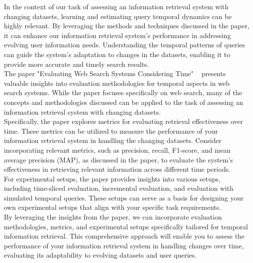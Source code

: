 In the context of our task of assessing an information retrieval system with changing datasets, learning and estimating
query temporal dynamics can be highly relevant.
By leveraging the methods and techniques discussed in the paper, it can enhance our information retrieval system's
performance in addressing evolving user information needs.
Understanding the temporal patterns of queries can guide the system's adaptation to changes in the datasets, enabling it
to provide more accurate and timely search results. \\

The paper "Evaluating Web Search Systems Considering Time" ~\cite{hofmann2014evaluating} presents valuable insights into
evaluation methodologies for temporal aspects in web search systems.
While the paper focuses specifically on web search, many of the concepts and methodologies discussed can be applied to
the task of assessing an information retrieval system with changing datasets. \\

Specifically, the paper explores metrics for evaluating retrieval effectiveness over time.
These metrics can be utilized to measure the performance of your information retrieval system in handling the changing
datasets.
Consider incorporating relevant metrics, such as precision, recall, F1-score, and mean average precision (MAP), as
discussed in the paper, to evaluate the system's effectiveness in retrieving relevant information across different time
periods.\\

For experimental setups, the paper provides insights into various setups, including time-sliced evaluation, incremental
evaluation, and evaluation with simulated temporal queries.
These setups can serve as a basis for designing your own experimental setups that align with your specific task
requirements.\\

By leveraging the insights from the paper, we can incorporate evaluation methodologies, metrics, and experimental setups
specifically tailored for temporal information retrieval.
This comprehensive approach will enable you to assess the performance of your information retrieval system in handling
changes over time, evaluating its adaptability to evolving datasets and user queries.\\

